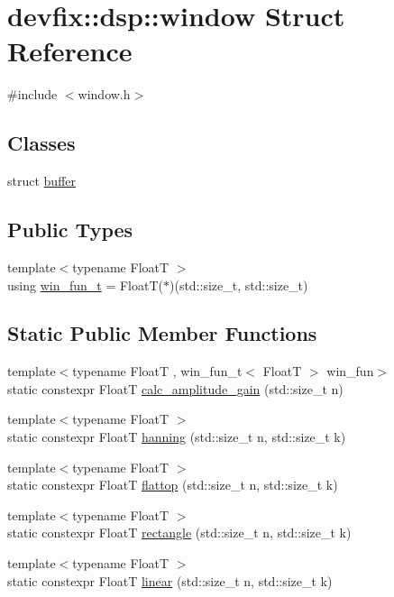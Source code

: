 \hypertarget{structdevfix_1_1dsp_1_1window}{}\section{devfix\+:\+:dsp\+:\+:window Struct Reference}
\label{structdevfix_1_1dsp_1_1window}


{\ttfamily \#include $<$window.\+h$>$}

\subsection*{Classes}
\begin{DoxyCompactItemize}
\item 
struct \hyperlink{structdevfix_1_1dsp_1_1window_1_1buffer}{buffer}
\end{DoxyCompactItemize}
\subsection*{Public Types}
\begin{DoxyCompactItemize}
\item 
{\footnotesize template$<$typename FloatT $>$ }\\using \hyperlink{structdevfix_1_1dsp_1_1window_ab2d2c0c5f5fca6dbcf91895115b69eac}{win\+\_\+fun\+\_\+t} = FloatT($\ast$)(std\+::size\+\_\+t, std\+::size\+\_\+t)
\end{DoxyCompactItemize}
\subsection*{Static Public Member Functions}
\begin{DoxyCompactItemize}
\item 
{\footnotesize template$<$typename FloatT , win\+\_\+fun\+\_\+t$<$ Float\+T $>$ win\+\_\+fun$>$ }\\static constexpr FloatT \hyperlink{structdevfix_1_1dsp_1_1window_aeba7905479c64bca5ac2fce0c6dbbf0b}{calc\+\_\+amplitude\+\_\+gain} (std\+::size\+\_\+t n)
\item 
{\footnotesize template$<$typename FloatT $>$ }\\static constexpr FloatT \hyperlink{structdevfix_1_1dsp_1_1window_a94b16d1da4a560e625ae93284ed6f1a4}{hanning} (std\+::size\+\_\+t n, std\+::size\+\_\+t k)
\item 
{\footnotesize template$<$typename FloatT $>$ }\\static constexpr FloatT \hyperlink{structdevfix_1_1dsp_1_1window_a43beeead6e8922f5be05b6e17f7f2664}{flattop} (std\+::size\+\_\+t n, std\+::size\+\_\+t k)
\item 
{\footnotesize template$<$typename FloatT $>$ }\\static constexpr FloatT \hyperlink{structdevfix_1_1dsp_1_1window_a15b34e7a9a7b76046b63347ac56b3236}{rectangle} (std\+::size\+\_\+t n, std\+::size\+\_\+t k)
\item 
{\footnotesize template$<$typename FloatT $>$ }\\static constexpr FloatT \hyperlink{structdevfix_1_1dsp_1_1window_a334a42b01504381fb13459f566aa2025}{linear} (std\+::size\+\_\+t n, std\+::size\+\_\+t k)
\end{DoxyCompactItemize}


